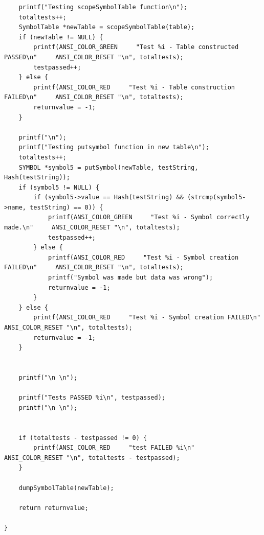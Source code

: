 \documentclass[a4paper,10pt,titlepage]{report}
\begin{document}
\begin{lstlisting}
    printf("Testing scopeSymbolTable function\n");
    totaltests++;
    SymbolTable *newTable = scopeSymbolTable(table);
    if (newTable != NULL) {
        printf(ANSI_COLOR_GREEN     "Test %i - Table constructed PASSED\n"     ANSI_COLOR_RESET "\n", totaltests);
        testpassed++;
    } else {
        printf(ANSI_COLOR_RED     "Test %i - Table construction FAILED\n"     ANSI_COLOR_RESET "\n", totaltests);
        returnvalue = -1;
    }

    printf("\n");
    printf("Testing putsymbol function in new table\n");
    totaltests++;
    SYMBOL *symbol5 = putSymbol(newTable, testString, Hash(testString));
    if (symbol5 != NULL) {
        if (symbol5->value == Hash(testString) && (strcmp(symbol5->name, testString) == 0)) {
            printf(ANSI_COLOR_GREEN     "Test %i - Symbol correctly made.\n"     ANSI_COLOR_RESET "\n", totaltests);
            testpassed++;
        } else {
            printf(ANSI_COLOR_RED     "Test %i - Symbol creation FAILED\n"     ANSI_COLOR_RESET "\n", totaltests);
            printf("Symbol was made but data was wrong");
            returnvalue = -1;
        }
    } else {
        printf(ANSI_COLOR_RED     "Test %i - Symbol creation FAILED\n"     ANSI_COLOR_RESET "\n", totaltests);
        returnvalue = -1;
    }


    printf("\n \n");

    printf("Tests PASSED %i\n", testpassed);
    printf("\n \n");


    if (totaltests - testpassed != 0) {
        printf(ANSI_COLOR_RED     "test FAILED %i\n"     ANSI_COLOR_RESET "\n", totaltests - testpassed);
    }

    dumpSymbolTable(newTable);

    return returnvalue;

}
\end{lstlisting}
\newpage
\end{document}
